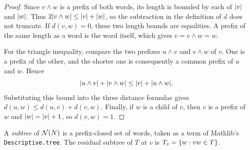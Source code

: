 \begin{proof}
\leanok
Since $v\wedge w$ is a prefix of both words, its length is bounded by each of
$\lvert v \rvert$ and $\lvert w \rvert$. Thus
$2\lvert v\wedge w \rvert\leq\lvert v \rvert+\lvert w \rvert$, so the subtraction in the definition of $d$ does
not truncate. If $d(v,w)=0$, these two length bounds are equalities. A prefix of the same
length as a word is the word itself, which gives $v=v\wedge w=w$.

For the triangle inequality, compare the two prefixes $u\wedge v$ and $v\wedge w$ of $v$.
One is a prefix of the other, and the shorter one is consequently a common prefix of $u$
and $w$. Hence
\[
  \lvert u\wedge v \rvert+\lvert v\wedge w \rvert
  \leq \lvert v \rvert+\lvert u\wedge w \rvert.
\]
Substituting this bound into the three distance formulae gives
$d(u,w)\leq d(u,v)+d(v,w)$. Finally, if $w$ is a child of $v$, then $v$ is a prefix of $w$
and $\lvert w \rvert=\lvert v \rvert+1$, so $d(v,w)=1$.
\end{proof}

\begin{definition}[Subtrees]
\label{def:subtree}
\leanok
A \emph{subtree} of $\mathcal{N}(N)$ is a prefix-closed set of words, taken as a term of Mathlib's
\texttt{Descriptive.tree}. The residual subtree of $T$ at $v$ is
$T_v=\{w : vw\in T\}$.
\end{definition}
